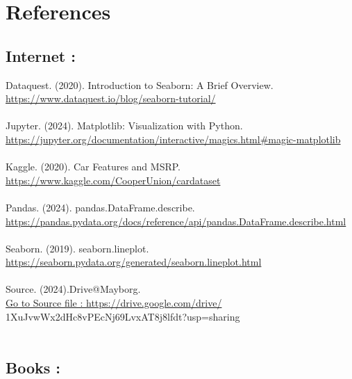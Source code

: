 \documentclass{article}
\begin{document}
\newpage
\section{References}
\vspace{1cm}
{\fontsize{15}{15}\selectfont
\subsection{Internet :}
\vspace{0.6cm}
Dataquest. (2020). Introduction to Seaborn: A Brief Overview.\\
\href{https://www.dataquest.io/blog/seaborn-tutorial/}{https://www.dataquest.io/blog/seaborn-tutorial/}
\\
\\
Jupyter. (2024). Matplotlib: Visualization with Python.\\
\href{https://jupyter.org/documentation/interactive/magics.html#magic-matplotlib}{https://jupyter.org/documentation/interactive/magics.html#magic-matplotlib}
\\
\\
Kaggle. (2020). Car Features and MSRP.\\
\href{https://www.kaggle.com/CooperUnion/cardataset}{https://www.kaggle.com/CooperUnion/cardataset}
\\
\\
Pandas. (2024). pandas.DataFrame.describe.\\
\href{https://pandas.pydata.org/docs/reference/api/pandas.DataFrame.describe.html}{https://pandas.pydata.org/docs/reference/api/pandas.DataFrame.describe.html}
\\
\\
Seaborn. (2019). seaborn.lineplot.\\
\href{https://seaborn.pydata.org/generated/seaborn.lineplot.html}{https://seaborn.pydata.org/generated/seaborn.lineplot.html}
\\
\\
Source. (2024).Drive@Mayborg.\\
\href{https://drive.google.com/drive/folders/1XuJvwWx2dHc8vPEcNj69LvxAT8j8lfdt?usp=sharing}{Go to Source file : https://drive.google.com/drive/}\\
1XuJvwWx2dHc8vPEcNj69LvxAT8j8lfdt?usp=sharing
\\
\\ 
\subsection{Books :}
\vspace{0.6cm}

}
\end{document}
